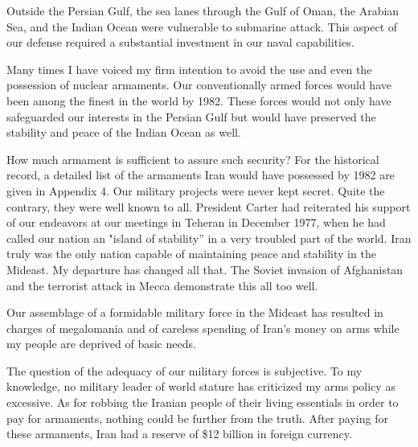 Outside the Persian Gulf, the sea lanes through the Gulf of Oman, the Arabian Sea, and the Indian Ocean were vulnerable to submarine attack. This aspect of our defense required a substantial investment in our naval capabilities. 

Many times I have voiced my firm intention to avoid the use and even the possession of nuclear armaments. Our conventionally armed forces would have been among the finest in the world by 1982. These forces would not only have safeguarded our interests in the Persian Gulf but would have preserved the stability and peace of the Indian Ocean as well. 

How much armament is sufficient to assure such security? For the historical record, a detailed list of the armaments Iran would have possessed by 1982 are given in Appendix 4. Our military projects were never kept secret. Quite the contrary, they were well known to all. President Carter had reiterated his support of our endeavors at our meetings in Teheran in December 1977, when he had called our nation an "island of stability” in a very troubled part of the world. Iran truly was the only nation capable of maintaining peace and stability in the Mideast. My departure has changed all that. The Soviet invasion of Afghanistan and the terrorist attack in Mecca demonstrate this all too well. 

Our assemblage of a formidable military force in the Mideast has resulted in charges of megalomania and of careless spending of Iran's money on arms while my people are deprived of basic needs. 

The question of the adequacy of our military forces is subjective. To my knowledge, no military leader of world stature has criticized my arms policy as excessive. As for robbing the Iranian people of their living essentials in order to pay for armaments, nothing could be further from the truth. After paying for these armaments, Iran had a reserve of \$12 billion in foreign currency. 